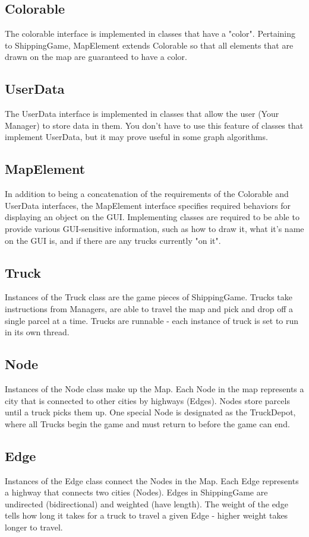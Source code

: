 \documentclass[11pt]{article}
\begin{document}
\subsection{Colorable}
The colorable interface is implemented in classes that have a "color". Pertaining to ShippingGame, MapElement extends Colorable so that all elements that are drawn on the map are guaranteed to have a color.
\subsection{UserData}
The UserData interface is implemented in classes that allow the user (Your Manager) to store data in them. You don't have to use this feature of classes that implement UserData, but it may prove useful in some graph algorithms.
\subsection{MapElement}
In addition to being a concatenation of the requirements of the Colorable and UserData interfaces, the MapElement interface specifies required behaviors for displaying an object on the GUI. Implementing classes are required to be able to provide various GUI-sensitive information, such as how to draw it, what it's name on the GUI is, and if there are any trucks currently "on it".
\subsection{Truck}
Instances of the Truck class are the game pieces of ShippingGame. Trucks take instructions from Managers, are able to travel the map and pick and drop off a single parcel at a time. Trucks are runnable - each instance of truck is set to run in its own thread.
\subsection{Node}
Instances of the Node class make up the Map. Each Node in the map represents a city that is connected to other cities by highways (Edges). Nodes store parcels until a truck picks them up. One special Node is designated as the TruckDepot, where all Trucks begin the game and must return to before the game can end.
\subsection{Edge}
Instances of the Edge class connect the Nodes in the Map. Each Edge represents a highway that connects two cities (Nodes). Edges in ShippingGame are undirected (bidirectional) and weighted (have length). The weight of the edge tells how long it takes for a truck to travel a given Edge - higher weight takes longer to travel.
\end{document}

